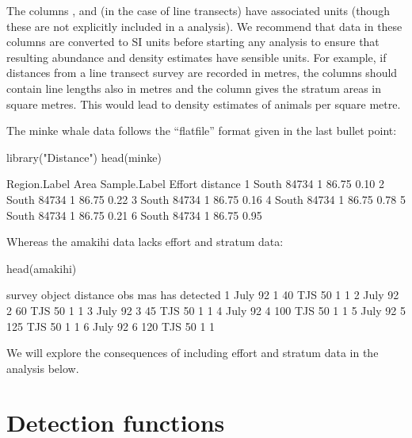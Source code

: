 \documentclass[article,shortnames]{jss}
\begin{document}
The columns ,  and (in the case of line
transects)  have associated units (though these are not
explicitly included in a  analysis). We recommend that
data in these columns are converted to SI units before starting any
analysis to ensure that resulting abundance and density estimates have
sensible units. For example, if distances from a line transect survey
are recorded in metres, the  columns should contain line
lengths also in metres and the  column gives the stratum
areas in square metres. This would lead to density estimates of animals
per square metre.

The minke whale data follows the ``flatfile'' format given in the last
bullet point:

\begin{CodeChunk}
\begin{CodeInput}
library("Distance")
head(minke)
\end{CodeInput}
\begin{CodeOutput}
  Region.Label  Area Sample.Label Effort distance
1        South 84734            1  86.75     0.10
2        South 84734            1  86.75     0.22
3        South 84734            1  86.75     0.16
4        South 84734            1  86.75     0.78
5        South 84734            1  86.75     0.21
6        South 84734            1  86.75     0.95
\end{CodeOutput}
\end{CodeChunk}

Whereas the amakihi data lacks effort and stratum data:

\begin{CodeChunk}
\begin{CodeInput}
head(amakihi)
\end{CodeInput}
\begin{CodeOutput}
   survey object distance obs mas has detected
1 July 92      1       40 TJS  50   1        1
2 July 92      2       60 TJS  50   1        1
3 July 92      3       45 TJS  50   1        1
4 July 92      4      100 TJS  50   1        1
5 July 92      5      125 TJS  50   1        1
6 July 92      6      120 TJS  50   1        1
\end{CodeOutput}
\end{CodeChunk}

We will explore the consequences of including effort and stratum data in
the analysis below.

\section{Detection functions}\label{detection-functions}
\end{document}
